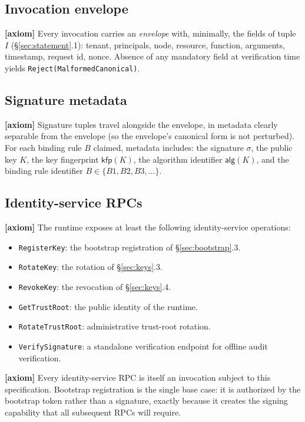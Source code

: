 \documentclass[11pt,a4paper]{article}
\newcommand{\axiom}{\textcolor{axiomcolor}{\textbf{[axiom]}}\xspace}
\begin{document}
\subsection{Invocation envelope}

\axiom{} Every invocation carries an \emph{envelope} with, minimally,
the fields of tuple $I$ (\S\ref{sec:statement}.1): tenant, principals,
node, resource, function, arguments, timestamp, request id, nonce.
Absence of any mandatory field at verification time yields
\texttt{Reject(MalformedCanonical)}.

\subsection{Signature metadata}

\axiom{} Signature tuples travel alongside the envelope, in metadata
clearly separable from the envelope (so the envelope's canonical form
is not perturbed). For each binding rule $B$ claimed, metadata
includes: the signature $\sigma$, the public key $K$, the key
fingerprint $\mathsf{kfp}(K)$, the algorithm identifier
$\mathsf{alg}(K)$, and the binding rule identifier
$B \in \{B1, B2, B3, \ldots\}$.

\subsection{Identity-service RPCs}

\axiom{} The runtime exposes at least the following identity-service
operations:

\begin{itemize}[leftmargin=2em,itemsep=0.15em]
    \item \texttt{RegisterKey}: the bootstrap registration of
    \S\ref{sec:bootstrap}.3.
    \item \texttt{RotateKey}: the rotation of \S\ref{sec:keys}.3.
    \item \texttt{RevokeKey}: the revocation of \S\ref{sec:keys}.4.
    \item \texttt{GetTrustRoot}: the public identity of the runtime.
    \item \texttt{RotateTrustRoot}: administrative trust-root rotation.
    \item \texttt{VerifySignature}: a standalone verification endpoint
    for offline audit verification.
\end{itemize}

\axiom{} Every identity-service RPC is itself an invocation subject to
this specification. Bootstrap registration is the single base case:
it is authorized by the bootstrap token rather than a signature,
exactly because it creates the signing capability that all subsequent
RPCs will require.
\end{document}
